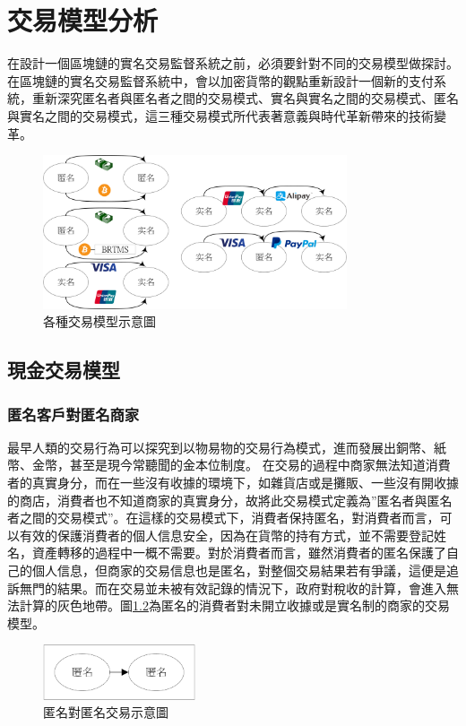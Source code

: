 
\chapter{交易模型分析}
在設計一個區塊鏈的實名交易監督系統之前，必須要針對不同的交易模型做探討。
在區塊鏈的實名交易監督系統中，會以加密貨幣的觀點重新設計一個新的支付系統，重新深究匿名者與匿名者之間的交易模式、實名與實名之間的交易模式、匿名與實名之間的交易模式，這三種交易模式所代表著意義與時代革新帶來的技術變革。
\begin{figure}[h]
	\centering
	\includegraphics[width = 0.8\textwidth]{modeall.png}
	\caption{各種交易模型示意圖}\label{modeall}
\end{figure}

	\section{現金交易模型}
		\subsection{匿名客戶對匿名商家}最早人類的交易行為可以探究到以物易物的交易行為模式，進而發展出銅幣、紙幣、金幣，甚至是現今常聽聞的金本位制度。 
		在交易的過程中商家無法知道消費者的真實身分，而在一些沒有收據的環境下，如雜貨店或是攤販、一些沒有開收據的商店，消費者也不知道商家的真實身分，故將此交易模式定義為”匿名者與匿名者之間的交易模式”。在這樣的交易模式下，消費者保持匿名，對消費者而言，可以有效的保護消費者的個人信息安全，因為在貨幣的持有方式，並不需要登記姓名，資產轉移的過程中一概不需要。對於消費者而言，雖然消費者的匿名保護了自己的個人信息，但商家的交易信息也是匿名，對整個交易結果若有爭議，這便是追訴無門的結果。而在交易並未被有效記錄的情況下，政府對稅收的計算，會進入無法計算的灰色地帶。圖\ref{modeaa}為匿名的消費者對未開立收據或是實名制的商家的交易模型。

		\begin{figure}[h]
			\centering
			\includegraphics[width = 0.4\textwidth]{modeaa.png}
			\caption{匿名對匿名交易示意圖}\label{modeaa}
		\end{figure}

